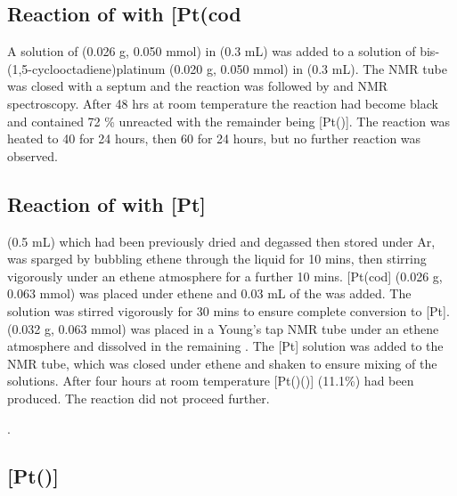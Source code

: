 \subsection*{Reaction of \tButhixantphos{} with \texorpdfstring{[Pt(cod\ce{)2]}} P}

A solution of \tButhixantphos{} (0.026 g, 0.050 mmol) in  (0.3 mL) was added to a solution of bis-(1,5-cyclooctadiene)platinum (0.020 g, 0.050 mmol) in  (0.3 mL).  The NMR tube was closed with a septum and the reaction was followed by \proton{} and \phosphorus{} NMR spectroscopy.  After 48 hrs at room temperature the reaction had become black and contained 72 \% unreacted \tButhixantphos{} with the remainder being [Pt(\tButhixantphos)].  The reaction was heated to 40 \degC{} for 24 hours, then 60 \degC{} for 24 hours, but no further reaction was observed.  

\subsection*{Reaction of \tBusixantphos{} with \texorpdfstring{[Pt]} P}

 (0.5 mL) which had been previously dried and degassed then stored under Ar, was sparged by bubbling ethene through the liquid for 10 mins, then stirring vigorously under an ethene atmosphere for a further 10 mins.  [Pt(cod] (0.026 g, 0.063 mmol) was placed under ethene and 0.03 mL of the  was added.  The solution was stirred vigorously for 30 mins to ensure complete conversion to [Pt].  \tBusixantphos(0.032 g, 0.063 mmol) was placed in a Young's tap NMR tube under an ethene atmosphere and dissolved in the remaining .  The [Pt] solution was added to the NMR tube, which was closed under ethene and shaken to ensure mixing of the solutions.  After four hours at room temperature [Pt(\tBusixantphos)()] (11.1\%) had been produced.  The reaction did not proceed further.

.

\subsection*{\texorpdfstring{[Pt(\tButhixantphos)]} P}


